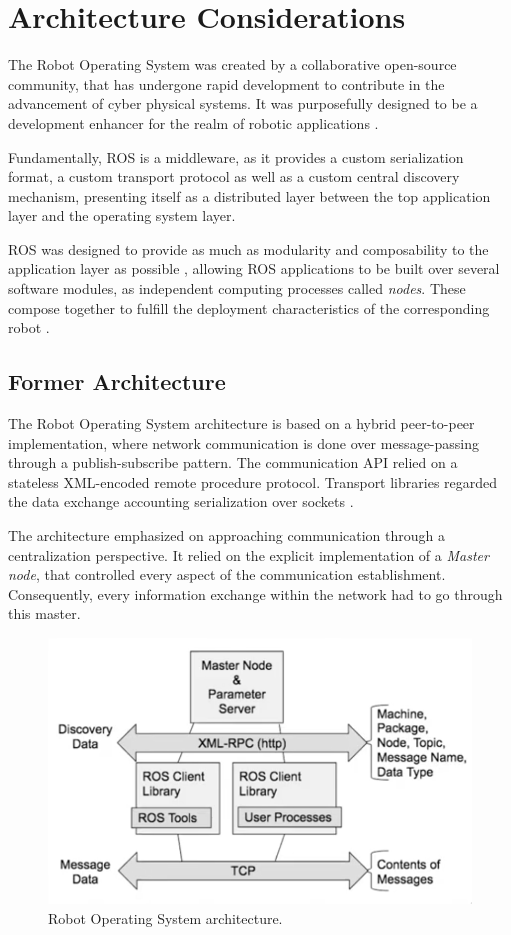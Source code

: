 \section{Architecture Considerations}

The Robot Operating System was created by a collaborative open-source community, that has undergone rapid development \cite{cousins2011exponential} to contribute in the advancement of cyber physical systems. It was purposefully designed to be a development enhancer for the realm of robotic applications \cite{diluoffo2018robot, intro-ros}.

Fundamentally, ROS is a middleware, as it provides a custom serialization format, a custom transport protocol as well as a custom central discovery mechanism, presenting itself as a distributed layer between the top application layer and the operating system layer. 

ROS was designed to provide as much as modularity and composability to the application layer as possible \cite{casini2019response}, allowing ROS applications to be built over several software modules, as independent computing processes called \textit{nodes}. These compose together to fulfill the deployment characteristics of the corresponding robot \cite{maruyama2016exploring}.

\subsection{Former Architecture}

The Robot Operating System architecture is based on a hybrid peer-to-peer implementation, where network communication is done over message-passing through a publish-subscribe pattern. The communication API relied on a stateless XML-encoded remote procedure protocol. Transport libraries regarded the data exchange accounting serialization over sockets \cite{white2016sros, dieber2020penetration}.

The architecture emphasized on approaching communication through a centralization perspective. It relied on the explicit implementation of a \textit{Master node}, that controlled every aspect of the communication establishment. Consequently, every information exchange within the network had to go through this master.


\begin{figure}[H]
  \centering
  \includegraphics[width=0.6\linewidth]{img/former-ros1-architecture.png}
  \caption{Robot Operating System architecture.}
  \label{fig:ros1-architecture}
\end{figure}

